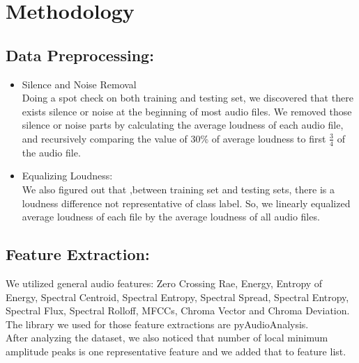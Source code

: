 \section{Methodology}
\subsection{Data Preprocessing:}
\begin{itemize}
	\item Silence and Noise Removal\\
	Doing a spot check on both training and testing set, we discovered that there exists silence or noise at the beginning of most audio files. We removed those silence or noise parts by calculating the average loudness of each audio file, and recursively comparing the value of 30\% of average loudness to first $\frac{3}{4}$ of the audio file.\\
	\item Equalizing Loudness:\\
	We also figured out that ,between training set and testing sets, there is a loudness difference not representative of class label. So, we linearly equalized average loudness of each file by the average loudness of all audio files. \\
\end{itemize}
\subsection{Feature Extraction:}
	We utilized general audio features: Zero Crossing Rae, Energy, Entropy of Energy, Spectral Centroid, Spectral Entropy, Spectral Spread, Spectral Entropy, Spectral Flux, Spectral Rolloff,  MFCCs, Chroma Vector and Chroma Deviation. The library we used for those feature extractions are pyAudioAnalysis\cite{b1}.\\
	After analyzing the dataset, we also noticed that number of local minimum amplitude peaks is one representative feature and we added that to feature list.\\
